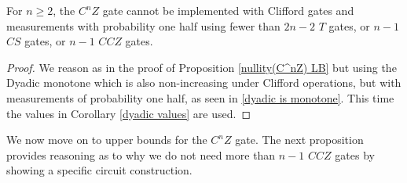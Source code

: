 \documentclass[12pt]{dalthesis}
\begin{document}
\begin{lemma}
\label{CCZ lowerbound}
For $n \geq 2$, the $C^n Z$ gate cannot be implemented with Clifford gates and measurements with probability one half using fewer than $2n-2$ $T$ gates, or $n-1$ $CS$ gates, or $n-1$ $CCZ$ gates.
\end{lemma}
\begin{proof}
We reason as in the proof of Proposition \ref{nullity(C^nZ) LB} but using the Dyadic monotone which is also non-increasing under Clifford operations, but with measurements of probability one half, as seen in \ref{dyadic is monotone}. This time the values in Corollary \ref{dyadic values} are used.
\end{proof}

We now move on to upper bounds for the $C^nZ$ gate. The next proposition provides reasoning as to why we do not need more than $n-1$ $CCZ$ gates by showing a specific circuit construction.
\end{document}
